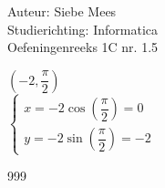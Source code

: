 \documentclass[a4paper]{article}
\begin{document}
  
\noindent \large Auteur: Siebe Mees \\
\noindent \large Studierichting: Informatica\\
\noindent \large Oefeningenreeks 1C nr. 1.5\\

\medskip

\normalsize

$ \left( -2, \dfrac{\pi}{2} \right) $\\

$ \left \{
\begin{array}{l}
    x = -2 \cos \left( \dfrac{\pi}{2} \right) = 0 \\
    y = -2 \sin \left( \dfrac{\pi}{2} \right) = -2 
\end{array}
\right .$\\ 

\begin{thebibliography}{999}

\end{thebibliography}
\end{document}
